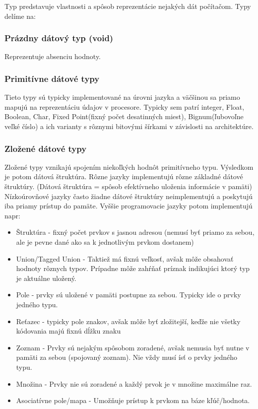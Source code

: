\documentclass[a4paper,10pt]{article}
\begin{document}
\begin{multicols}{2}
	Typ predstavuje vlastnosti a spôsob reprezentácie nejakých dát počítačom.
	Typy delíme na:	
	
	\subsubsection{Prázdny dátový typ (void)}
	
		Reprezentuje absenciu hodnoty.
	
	\subsubsection{Primitívne dátové typy}
	
		Tieto typy sú typicky implementované na úrovni jazyka a väčšinou sa priamo mapujú na reprezentáciu údajov v procesore. Typicky sem patrí integer, Float, Boolean, Char, Fixed Point(fixný počet desatinných miest), Bignum(ľubovoľne veľké číslo) a ich varianty s rôznymi bitovými šírkami v závislosti na architektúre.
		
	\subsubsection{Zložené dátové typy}
	
		Zložené typy vznikajú spojením niekoľkých hodnôt primitívneho typu. Výsledkom je potom dátová štruktúra.
		Rôzne jazyky implementujú rôzne základné dátové štruktúry. (Dátová štruktúra = spôsob efektívneho uloženia informácie v pamäti) Nízkoúrovňové jazyky často žiadne dátové štruktúry neimplementujú a poskytujú iba priamy prístup do pamäte. Vyššie programovacie jazyky potom implementujú napr:
	
		\begin{itemize}
			\item Štruktúra - fixný počet prvkov s jasnou adresou (nemusí byť priamo za sebou, ale je pevne dané ako sa k jednotlivým prvkom dostanem)
			\item Union/Tagged Union - Taktiež má fixnú veľkosť, avšak môže obsahovať hodnoty rôznych typov. Prípadne môže zahŕňať príznak indikujúci ktorý typ je aktuálne uložený.
			\item Pole - prvky sú uložené v pamäti postupne za sebou. Typicky ide o prvky jedného typu.
			\item Reťazec - typicky pole znakov, avšak môže byť zložitejší, keďže nie všetky kódovania majú fixnú dĺžku znaku
			\item Zoznam - Prvky sú nejakým spôsobom zoradené, avšak nemusia byť nutne v pamäti za sebou (spojovaný zoznam). Nie vždy musí ísť o prvky jedného typu.
			\item Množina - Prvky nie sú zoradené a každý prvok je v množine maximálne raz.
			\item Asociatívne pole/mapa - Umožňuje prístup k prvkom na báze kľúč/hodnota.
		\end{itemize}
		

\end{multicols}
\end{document}
